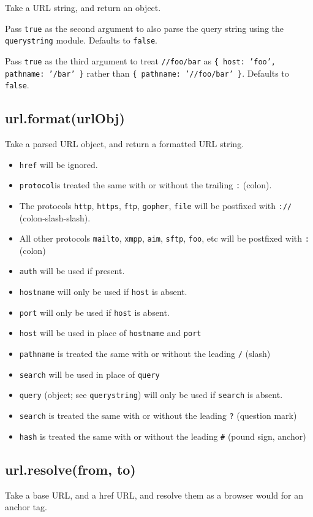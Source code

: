Take a URL string, and return an object.

Pass \texttt{true} as the second argument to also parse the query string
using the \texttt{querystring} module. Defaults to \texttt{false}.

Pass \texttt{true} as the third argument to treat \texttt{//foo/bar} as
\texttt{\{ host: 'foo', pathname: '/bar' \}} rather than
\texttt{\{ pathname: '//foo/bar' \}}. Defaults to \texttt{false}.

\subsection{url.format(urlObj)}

Take a parsed URL object, and return a formatted URL string.

\begin{itemize}
\item
  \texttt{href} will be ignored.
\item
  \texttt{protocol}is treated the same with or without the trailing
  \texttt{:} (colon).
\item
  The protocols \texttt{http}, \texttt{https}, \texttt{ftp},
  \texttt{gopher}, \texttt{file} will be postfixed with \texttt{://}
  (colon-slash-slash).
\item
  All other protocols \texttt{mailto}, \texttt{xmpp}, \texttt{aim},
  \texttt{sftp}, \texttt{foo}, etc will be postfixed with \texttt{:}
  (colon)
\item
  \texttt{auth} will be used if present.
\item
  \texttt{hostname} will only be used if \texttt{host} is absent.
\item
  \texttt{port} will only be used if \texttt{host} is absent.
\item
  \texttt{host} will be used in place of \texttt{hostname} and
  \texttt{port}
\item
  \texttt{pathname} is treated the same with or without the leading
  \texttt{/} (slash)
\item
  \texttt{search} will be used in place of \texttt{query}
\item
  \texttt{query} (object; see \texttt{querystring}) will only be used if
  \texttt{search} is absent.
\item
  \texttt{search} is treated the same with or without the leading
  \texttt{?} (question mark)
\item
  \texttt{hash} is treated the same with or without the leading
  \texttt{\#} (pound sign, anchor)
\end{itemize}

\subsection{url.resolve(from, to)}

Take a base URL, and a href URL, and resolve them as a browser would for
an anchor tag.
